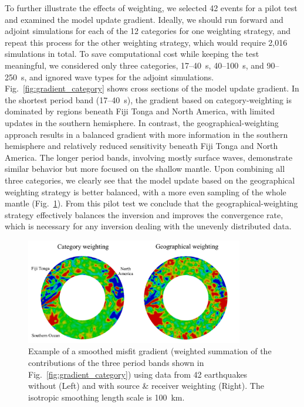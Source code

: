 To further illustrate the effects of weighting, we selected 42 events for a 
pilot test and examined the model update gradient. Ideally, we should run forward and adjoint simulations for 
each of the 12 categories for one weighting strategy, and repeat this process for the other weighting strategy, which would require 2,016
simulations in total.
To save computational cost while keeping the test meaningful,
we considered only three categories, 17--40~s, 40--100~s, 
and 90--250~s, and ignored wave types for the adjoint simulations. 
Fig.~\ref{fig:gradient_category} shows cross sections of the model update gradient.
In the shortest period band (17--40~s),
the gradient based on category-weighting is
dominated by regions beneath Fiji Tonga and North America,
with limited updates in the southern hemisphere.
In contrast, the geographical-weighting approach results in a balanced gradient with
more information in the southern hemisphere and relatively reduced sensitivity beneath Fiji Tonga and North America.  
The longer period bands, involving mostly surface waves,
demonstrate similar behavior but more focused on the shallow mantle.  
Upon combining all three categories, we clearly see that the model update based on the geographical 
weighting strategy is better balanced, with a more even sampling of the whole mantle (Fig.~\ref{fig:gradient_sum}).  
From this pilot test we conclude that the geographical-weighting strategy effectively 
balances the inversion and improves the convergence rate, which is necessary for any inversion dealing 
with the unevenly distributed data.

\begin{figure}
\centering
\includegraphics[width=0.85\textwidth]{ch-weighting/figures/Figure-11-small.pdf}
\caption{\small{Example of a smoothed misfit gradient (weighted summation of the contributions of the three period bands shown in Fig.~\ref{fig:gradient_category}) 
using data from 42 earthquakes without (Left) and with source \& receiver weighting (Right). The isotropic smoothing length scale is 100~km.
}}
\label{fig:gradient_sum}
\end{figure}

